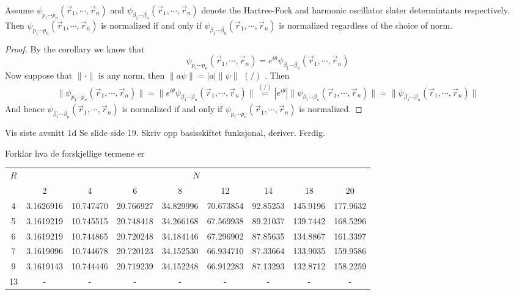 \documentclass[11pt,english,a4paper]{article}
\begin{document}
\begin{corollary}
Assume $\psi_{  p_1\cdots p_n}(\vec{r}_1,\cdots, \vec{r}_n)$ and $\psi_{  \beta_1\cdots \beta_n}(\vec{r}_1,\cdots, \vec{r}_n)$ denote the Hartree-Fock and harmonic oscillator slater determintants respectively. Then $\psi_{  p_1\cdots p_n}(\vec{r}_1,\cdots, \vec{r}_n)$ is normalized if and only if $\psi_{  \beta_1\cdots \beta_n}(\vec{r}_1,\cdots, \vec{r}_n)$ is normalized regardless of the choice of norm.
\end{corollary}
\begin{proof}
By the corollary we know that
\[
\psi_{  p_1\cdots p_n}(\vec{r}_1,\cdots, \vec{r}_n) = e^{ i \theta}\psi_{  \beta_1\cdots \beta_n}(\vec{r}_1,\cdots, \vec{r}_n) 
\]
Now suppose that $\|\cdot \|$ is any norm, then $\|a \psi \| = |a| \| \psi \|$ $(/)$ \parencite[124]{lindstrom_mathematical_2016}. Then
\begin{align*}
\|\psi_{  p_1\cdots p_n}(\vec{r}_1,\cdots, \vec{r}_n) \| = \|e^{ i \theta}\psi_{  \beta_1\cdots \beta_n}(\vec{r}_1,\cdots, \vec{r}_n)\| \stackrel{(/)}{=} |e^{ i \theta}|\|\psi_{  \beta_1\cdots \beta_n}(\vec{r}_1,\cdots, \vec{r}_n)\| = \|\psi_{  \beta_1\cdots \beta_n}(\vec{r}_1,\cdots, \vec{r}_n)\|
\end{align*}
And hence $\psi_{  \beta_1\cdots \beta_n}(\vec{r}_1,\cdots, \vec{r}_n)$ is normalized if and only if $\psi_{  p_1\cdots p_n}(\vec{r}_1,\cdots, \vec{r}_n)$ is normalized.
\end{proof}

Vis siste avsnitt 1d Se slide side 19. Skriv opp basisskiftet funksjonal, deriver. Ferdig.

Forklar hva de forskjellige termene er


\begin{tabular}{c | c c c c c c c c}
$R$ & \multicolumn{8}{c}{$N$}\\
  & 2         & 4         & 6         & 8         &12         &14        & 18       & 20\\
  \hline
4 & 3.1626916 & 10.747470 & 20.766927 & 34.829996 & 70.673854 & 92.85253 & 145.9196 & 177.9632\\
5 & 3.1619219 & 10.745515 & 20.748418 & 34.266168 & 67.569938 & 89.21037 & 139.7442 & 168.5296\\
6 & 3.1619219 & 10.744865 & 20.720248 & 34.184146 & 67.296902 & 87.85635 & 134.8867 & 161.3397\\
7 & 3.1619096 & 10.744678 & 20.720123 & 34.152530 & 66.934710 & 87.33664 & 133.9035 & 159.9586\\
9 & 3.1619143 & 10.744446 & 20.719239 & 34.152248 & 66.912283 & 87.13293 & 132.8712 & 158.2259\\
13& -         & -         & -         & -         & -         & -        & -        & -       \\
\end{tabular}
\end{document}
